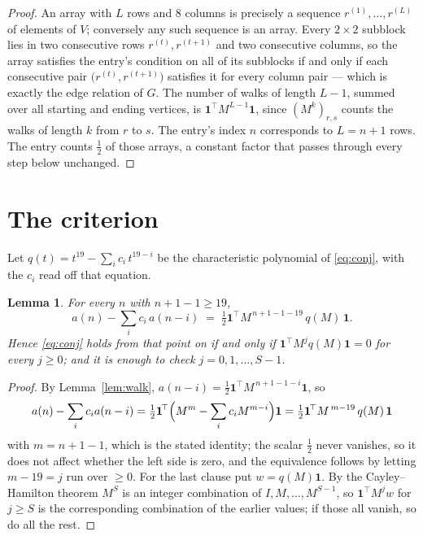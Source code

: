 \documentclass[11pt,a4paper]{article}
\theoremstyle{plain}
\newtheorem{lemma}[theorem]{Lemma}
\theoremstyle{definition}
\begin{document}
\begin{proof}
An array with $L$ rows and $8$ columns is precisely a sequence
$r^{(1)},\dots,r^{(L)}$ of elements of $V$; conversely any such sequence is an array.
Every $2\times2$ subblock lies in two consecutive rows $r^{(t)},r^{(t+1)}$ and two
consecutive columns, so the array satisfies the entry's condition on all of its subblocks
if and only if each consecutive pair $\bigl(r^{(t)},r^{(t+1)}\bigr)$ satisfies it for
every column pair --- which is exactly the edge relation of $G$. The number of walks of
length $L-1$, summed over all starting and ending vertices, is
$\mathbf{1}^{\!\top}M^{L-1}\mathbf{1}$, since $(M^{k})_{r,s}$ counts the walks of
length $k$ from $r$ to $s$. The entry's index $n$ corresponds to $L=n+1$ rows. The entry counts $\tfrac1{2}$ of those arrays, a constant factor that passes through every step below unchanged.
\end{proof}

\section{The criterion}

Let $q(t)=t^{19}-\sum_i c_i\,t^{19-i}$ be the characteristic polynomial of
\eqref{eq:conj}, with the $c_i$ read off that equation.

\begin{lemma}\label{lem:crit}
For every $n$ with $n+1-1\ge19$,
\[
a(n)-\sum_i c_i\,a(n-i)\;=\;\tfrac1{2}\mathbf{1}^{\!\top}M^{\,n+1-1-19}\,q(M)\,\mathbf{1} .
\]
Hence \eqref{eq:conj} holds from that point on if and only if
$\mathbf{1}^{\!\top}M^{j}q(M)\mathbf{1}=0$ for every $j\ge0$; and it is enough to check
$j=0,1,\dots,S-1$.
\end{lemma}

\begin{proof}
By Lemma~\ref{lem:walk}, $a(n-i)=\tfrac1{2}\mathbf{1}^{\!\top}M^{\,n+1-1-i}\mathbf{1}$, so
\[
a(n)-\sum_i c_i a(n-i)
=\tfrac1{2}\mathbf{1}^{\!\top}\Bigl(M^{m}-\sum_i c_i M^{m-i}\Bigr)\mathbf{1}
=\tfrac1{2}\mathbf{1}^{\!\top}M^{\,m-19}\,q(M)\,\mathbf{1}
\]
with $m=n+1-1$, which is the stated identity; the scalar $\tfrac1{2}$ never vanishes, so it does not affect whether the left side is zero, and the equivalence follows by letting
$m-19=j$ run over $\ge0$. For the last clause put $w=q(M)\mathbf{1}$. By the
Cayley--Hamilton theorem $M^{S}$ is an integer combination of $I,M,\dots,M^{S-1}$, so
$\mathbf{1}^{\!\top}M^{j}w$ for $j\ge S$ is the corresponding combination of the earlier
values; if those all vanish, so do all the rest.
\end{proof}
\end{document}
